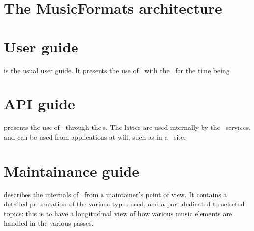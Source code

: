 \section{The MusicFormats architecture}


\section{User guide}

 is the usual user guide. It presents the use of \mf\ with the \CLI\ for the time being.


\section{API guide}

 presents the use of \mf\ through the \API s. The latter are used internally by the \CLI\ services, and can be used from applications at will, such as in a \Web\ site.


\section{Maintainance guide}

 describes the internals of \mf\ from a maintainer's point of view. It contains a detailed presentation of the various types used, and a part dedicated to selected topics: this is to have a longitudinal view of how various music elements are handled in the various passes.

